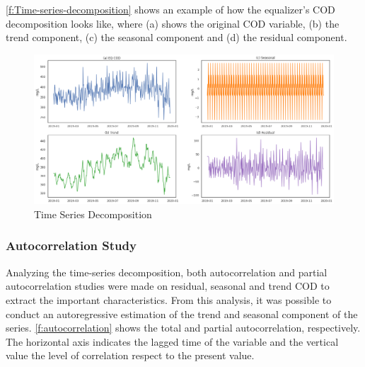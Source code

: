 \autoref{f:Time-series-decomposition} shows an example of how the equalizer’s COD decomposition looks like, where (a) shows the original COD variable, (b) the trend component, (c) the seasonal component and (d) the residual component.

\begin{figure}[h]
\centering
\includegraphics[width=\linewidth]{figures/Ch4/time_series_descompose.png}
\caption{Time Series Decomposition}
\label{f:Time-series-decomposition}
\end{figure}

\subsubsection{Autocorrelation Study}
\label{ss:autocorrelation}

Analyzing the time-series decomposition, both autocorrelation and partial autocorrelation studies were made on residual, seasonal and trend COD to extract the important characteristics. From this analysis, it was possible to conduct an autoregressive estimation of the trend and seasonal component of the series. \autoref{f:autocorrelation} shows the total and partial autocorrelation, respectively. The horizontal axis indicates the lagged time of the variable and the vertical value the level of correlation respect to the present value.

